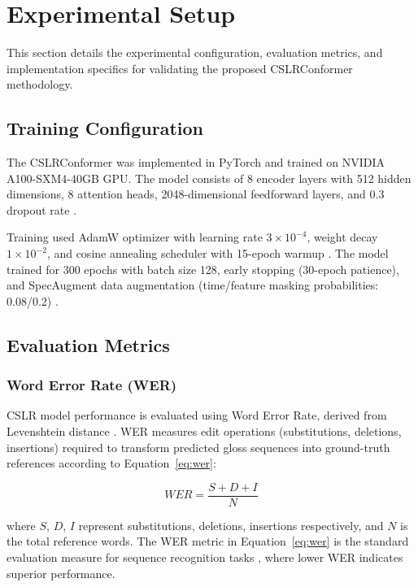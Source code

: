 \section{Experimental Setup}
\label{sec:experimental_setup}
This section details the experimental configuration, evaluation metrics, and implementation specifics for validating the proposed CSLRConformer methodology.

\subsection{Training Configuration}

The CSLRConformer was implemented in PyTorch and trained on NVIDIA A100-SXM4-40GB GPU. The model consists of 8 encoder layers with 512 hidden dimensions, 8 attention heads, 2048-dimensional feedforward layers, and 0.3 dropout rate \cite{srivastava2014dropout}.

Training used AdamW optimizer \cite{loshchilov2017decoupled} with learning rate $3 \times 10^{-4}$, weight decay $1 \times 10^{-2}$, and cosine annealing scheduler with 15-epoch warmup \cite{loshchilov2016sgdr}. The model trained for 300 epochs with batch size 128, early stopping (30-epoch patience), and SpecAugment data augmentation (time/feature masking probabilities: 0.08/0.2) \cite{park2019specaugment}.

\subsection{Evaluation Metrics}

\subsubsection{Word Error Rate (WER)}

CSLR model performance is evaluated using Word Error Rate, derived from Levenshtein distance \cite{levenshtein1966binary}. WER measures edit operations (substitutions, deletions, insertions) required to transform predicted gloss sequences into ground-truth references according to Equation~\ref{eq:wer}:

\begin{equation}
WER = \frac{S+D+I}{N}
\label{eq:wer}
\end{equation}

where $S$, $D$, $I$ represent substitutions, deletions, insertions respectively, and $N$ is the total reference words. The WER metric in Equation~\ref{eq:wer} is the standard evaluation measure for sequence recognition tasks \cite{morris2004and}, where lower WER indicates superior performance.

